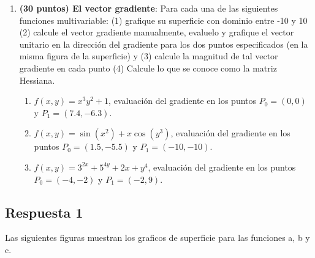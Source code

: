 \documentclass[12 pt]{article}
\begin{document}
\begin{enumerate}
\item \textbf{(30 puntos) El vector gradiente}: Para cada una de las siguientes
funciones multivariable: (1) grafique su superficie con dominio entre
-10 y 10 (2) calcule el vector gradiente manualmente, evaluelo y grafique
el vector unitario en la dirección del gradiente para los dos puntos
especificados (en la misma figura de la superficie) y (3) calcule
la magnitud de tal vector gradiente en cada punto (4) Calcule lo que
se conoce como la matriz Hessiana. 
\begin{enumerate}
\item $f\left(x,y\right)=x^{3}y^{2}+1$, evaluación del gradiente en los
puntos $P_{0}=\left(0,0\right)$ y $P_{1}=\left(7.4,-6.3\right)$.
\item $f\left(x,y\right)=\sin\left(x^{2}\right)+x\cos\left(y^{3}\right)$,
evaluación del gradiente en los puntos $P_{0}=\left(1.5,-5.5\right)$
y $P_{1}=\left(-10,-10\right)$.
\item $f\left(x,y\right)=3^{2x}+5^{4y}+2x+y^{4}$, evaluación del gradiente
en los puntos $P_{0}=\left(-4,-2\right)$ y $P_{1}=\left(-2,9\right)$.
\end{enumerate}
\end{enumerate}
\subsection{Respuesta 1}
Las siguientes figuras muestran los graficos de superficie para las funciones a, b y c.
\end{document}

